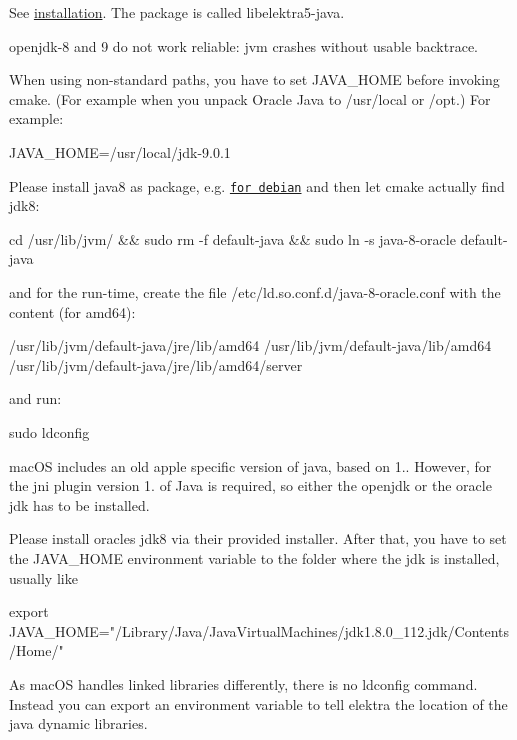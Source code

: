 See \hyperlink{doc_INSTALL_md}{installation}. The package is called {\ttfamily libelektra5-\/java}.

openjdk-\/8 and 9 do not work reliable\+: jvm crashes without usable backtrace.

When using non-\/standard paths, you have to set J\+A\+V\+A\+\_\+\+H\+O\+ME before invoking cmake. (For example when you unpack Oracle Java to {\ttfamily /usr/local} or {\ttfamily /opt}.) For example\+:


\begin{DoxyCode}
JAVA\_HOME=/usr/local/jdk-9.0.1
\end{DoxyCode}


Please install java8 as package, e.\+g. \href{http://www.webupd8.org/2014/03/how-to-install-oracle-java-8-in-debian.html}{\tt for debian} and then let cmake actually find jdk8\+:


\begin{DoxyCode}
cd /usr/lib/jvm/ && sudo rm -f default-java && sudo ln -s java-8-oracle default-java
\end{DoxyCode}


and for the run-\/time, create the file {\ttfamily /etc/ld.so.\+conf.\+d/java-\/8-\/oracle.conf} with the content (for amd64)\+:


\begin{DoxyCode}
/usr/lib/jvm/default-java/jre/lib/amd64
/usr/lib/jvm/default-java/lib/amd64
/usr/lib/jvm/default-java/jre/lib/amd64/server
\end{DoxyCode}


and run\+:


\begin{DoxyCode}
sudo ldconfig
\end{DoxyCode}


mac\+OS includes an old apple specific version of java, based on 1.. However, for the jni plugin version 1. of Java is required, so either the openjdk or the oracle jdk has to be installed.

Please install oracle\textquotesingle{}s jdk8 via their provided installer. After that, you have to set the J\+A\+V\+A\+\_\+\+H\+O\+ME environment variable to the folder where the jdk is installed, usually like


\begin{DoxyCode}
export JAVA\_HOME="/Library/Java/JavaVirtualMachines/jdk1.8.0\_112.jdk/Contents/Home/"
\end{DoxyCode}


As mac\+OS handles linked libraries differently, there is no ldconfig command. Instead you can export an environment variable to tell elektra the location of the java dynamic libraries.



